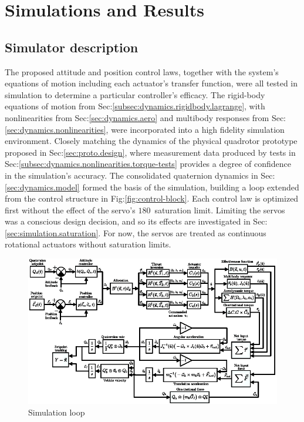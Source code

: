 \chapter{Simulations and Results}
\label{ch:simulation}
\section{Simulator description}
\label{sec:simulation.block}
The proposed attitude and position control laws, together with the system's equations of motion including each actuator's transfer function, were all tested in simulation to determine a particular controller's efficacy. The rigid-body equations of motion from Sec:\ref{subsec:dynamics.rigidbody.lagrange}, with nonlinearities from Sec:\ref{sec:dynamics.aero} and multibody responses from Sec:\ref{sec:dynamics.nonlinearities}, were incorporated into a high fidelity simulation environment. Closely matching the dynamics of the physical quadrotor prototype proposed in Sec:\ref{sec:proto.design}, where measurement data produced by tests in Sec:\ref{subsec:dynamics.nonlinearities.torque-tests} provides a degree of confidence in the simulation's accuracy. The consolidated quaternion dynamics in Sec:\ref{sec:dynamics.model} formed the basis of the simulation, building a loop extended from the control structure in Fig:\ref{fig:control-block}. Each control law is optimized first without the effect of the servo's $180$\textdegree ~saturation limit. Limiting the servos was a conscious design decision, and so its effects are investigated in Sec:\ref{sec:simulation.saturation}. For now, the servos are treated as continuous rotational actuators without saturation limits.
\par
\begin{figure}[htbp]
\centering
\includegraphics[width=\textwidth]{figs/simulation-block}
\vspace{-10pt}
\caption{Simulation loop}
\label{fig:simulation-block}
\end{figure}
